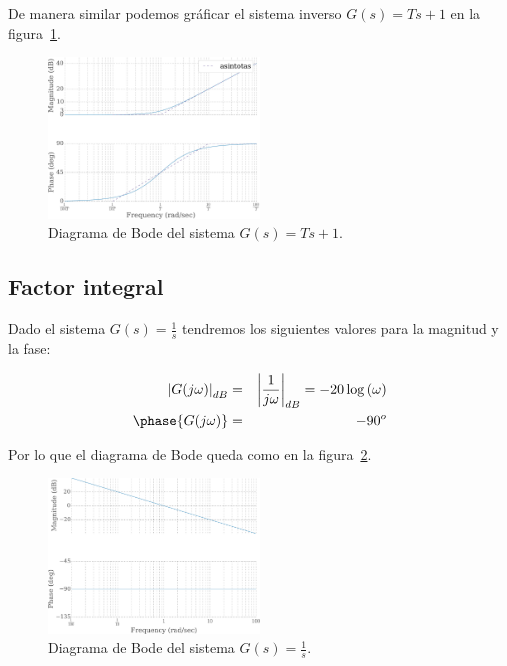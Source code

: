         De manera similar podemos gráficar el sistema inverso $G(s) =Ts + 1$ en la figura~\ref{fig:bodeprimerordeninverso}.

        \begin{figure}
            \centering
            \includegraphics[width=0.5\textwidth]{./imagenes/bodeprimerordeninverso.pdf}
            \caption{\label{fig:bodeprimerordeninverso}Diagrama de Bode del sistema $G(s) = Ts + 1$.}
        \end{figure}


        \subsection{Factor integral}

            Dado el sistema $G(s) = \frac{1}{s}$ tendremos los siguientes valores para la magnitud y la fase:

            \begin{eqnarray*}
                \left| G(j \omega) \right|_{dB} & = & \left| \frac{1}{j \omega} \right|_{dB} = -20 \log{(\omega)} \\
                \phase{G(j \omega)} & = & -90^o
            \end{eqnarray*}

            Por lo que el diagrama de Bode queda como en la figura~\ref{fig:bodeintegral}.

            \begin{figure}
                \centering
                \includegraphics[width=0.5\textwidth]{./imagenes/bodeintegral.pdf}
                \caption{\label{fig:bodeintegral}Diagrama de Bode del sistema $G(s) = \frac{1}{s}$.}
            \end{figure}

